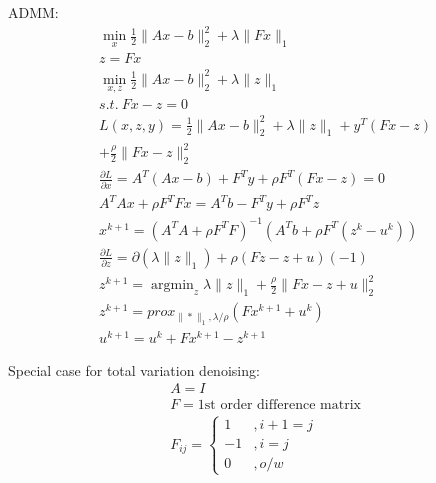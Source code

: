 \documentclass[8pt]{report}
\DeclareMathOperator*{\argmin}{argmin}
\newcommand{\norm}[1]{\|#1\|}
\begin{document}
\begin{multicols*}{2}
  ADMM:
  \begin{align*}
    &\min_x \frac{1}{2}\norm{Ax-b}_2^2 + \lambda \norm{Fx}_1\\
    &z=Fx\\
    &\min_{x,z} \frac{1}{2}\norm{Ax-b}_2^2 + \lambda \norm{z}_1\\
    &s.t.\ Fx-z=0\\
    &L(x,z,y) = \frac{1}{2}\norm{Ax-b}_2^2 + \lambda \norm{z}_1 + y^T(Fx-z)\\
    &+ \frac{\rho}{2}\norm{Fx-z}_2^2\\
    &\frac{\partial L}{\partial x} = A^T(Ax-b) + F^T y + \rho F^T(Fx-z)=0\\
    &A^T Ax + \rho F^TFx = A^T b - F^T y + \rho F^T z\\
    &x^{k+1} = (A^T A + \rho F^T F)^{-1}(A^T b + \rho F^T (z^k-u^k))\\
    &\frac{\partial L}{\partial z} = \partial (\lambda \norm{z}_1) + \rho(Fz-z+u)(-1)\\
    &z^{k+1} = \argmin_z \lambda \norm{z}_1 + \frac{\rho}{2} \norm{Fx-z+u}_2^2\\
    &z^{k+1} = prox_{\norm{*}_1, \lambda/\rho} (Fx^{k+1}+u^k)\\
    &u^{k+1} = u^k + Fx^{k+1} - z^{k+1}
  \end{align*}
    
  Special case for total variation denoising:
  \begin{align*}
    &A=I\\
    &F=\text{1st order difference matrix}\\
    &F_{ij}=
      \begin{cases}
        1 &, i+1=j\\
        -1&, i=j\\
        0&, o/w
      \end{cases}
  \end{align*}

  \vfill\null
  \columnbreak


\end{multicols*}
\end{document}
